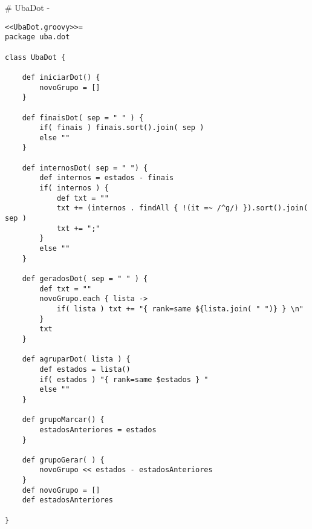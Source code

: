 # UbaDot {-}

\begin{lstlisting}
<<UbaDot.groovy>>=
package uba.dot

class UbaDot {

    def iniciarDot() {
        novoGrupo = []
    }

    def finaisDot( sep = " " ) {
        if( finais ) finais.sort().join( sep )
        else ""
    }

    def internosDot( sep = " ") {
        def internos = estados - finais
        if( internos ) {
            def txt = ""
            txt += (internos . findAll { !(it =~ /^g/) }).sort().join( sep )
            txt += ";"
        }
        else ""
    }

    def geradosDot( sep = " " ) {
        def txt = ""
        novoGrupo.each { lista ->
            if( lista ) txt += "{ rank=same ${lista.join( " ")} } \n"
        }
        txt
    }

    def agruparDot( lista ) {
        def estados = lista()
        if( estados ) "{ rank=same $estados } "
        else ""
    }

    def grupoMarcar() {
        estadosAnteriores = estados
    }

    def grupoGerar( ) {
        novoGrupo << estados - estadosAnteriores
    }
    def novoGrupo = []
    def estadosAnteriores

}



\end{lstlisting}
